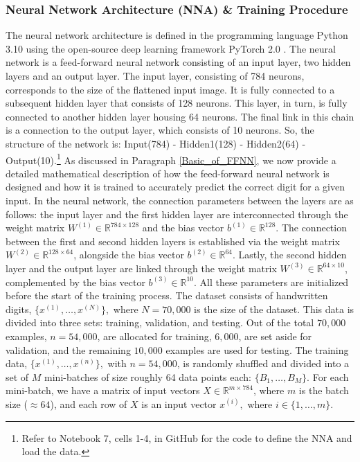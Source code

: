 \subsubsection{Neural Network Architecture (NNA) \& Training Procedure}
The neural network architecture is defined in the programming language Python 3.10 \cite{python} using the open-source deep learning framework PyTorch 2.0 \cite{NEURIPS2019_9015}. The neural network is a feed-forward neural network consisting of an input layer, two hidden layers and an output layer. The input layer, consisting of 784 neurons, corresponds to the size of the flattened input image. It is fully connected to a subsequent hidden layer that consists of 128 neurons. This layer, in turn, is fully connected to another hidden layer housing 64 neurons. The final link in this chain is a connection to the output layer, which consists of 10 neurons. So, the structure of the network is: Input(784) - Hidden1(128) - Hidden2(64) - Output(10).\footnote{Refer to Notebook 7, cells 1-4, in GitHub \cite{ThesisCode2023} for the code to define the NNA and load the data.} As discussed in Paragraph \ref{Basic_of_FFNN}, we now provide a detailed mathematical description of how the feed-forward neural network is designed and how it is trained to accurately predict the correct digit for a given input. In the neural network, the connection parameters between the layers are as follows: the input layer and the first hidden layer are interconnected through the weight matrix $W^{(1)} \in \mathbb{R}^{784 \times 128}$ and the bias vector $b^{(1)} \in \mathbb{R}^{128}$. The connection between the first and second hidden layers is established via the weight matrix $W^{(2)}\in\mathbb{R}^{128\times 64}$, alongside the bias vector $b^{(2)} \in \mathbb{R}^{64}$. Lastly, the second hidden layer and the output layer are linked through the weight matrix $W^{(3)}\in \mathbb{R}^{64\times10}$, complemented by the bias vector $b^{(3)}\in \mathbb{R}^{10}$. All these parameters are initialized before the start of the training process.
\newpage
The dataset consists of handwritten digits, $\{x^{(1)},\ldots,x^{(N)}\},$ where $N=70,000$ is the size of the dataset. This data is divided into three sets: training, validation, and testing. Out of the total $70,000$ examples, $n=54,000$, are allocated for training, $6,000$, are set aside for validation, and the remaining $10,000$ examples are used for testing. The training data, $\{x^{(1)},\ldots,x^{(n)}\},$ with $n=54,000$, is randomly shuffled and divided into a set of $M$ mini-batches of size roughly 64 data points each: $\{B_{1},\ldots,B_{M}\}.$ For each mini-batch, we have a matrix of input vectors $X \in \mathbb{R}^{m \times 784}$, where $m$ is the batch size ($\approx64$), and each row of $X$ is an input vector $x^{(i)},$ where $i \in \{1,\ldots,m\}.$
